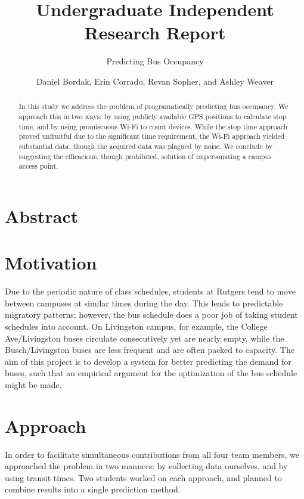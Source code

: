 \documentclass[letterpaper]{scrartcl}
\begin{document}
\title{Undergraduate Independent Research Report}
\subtitle{Predicting Bus Occupancy}
\author{Daniel Bordak, Erin Corrado, Revan Sopher, and Ashley Weaver}

\maketitle

\section*{Abstract}
\begin{abstract}
In this study we address the problem of programatically predicting bus occupancy.
We approach this in two ways: by using publicly available GPS positions to calculate stop time, and by using promiscuous Wi-Fi to count devices.
While the stop time approach proved unfruitful due to the significant time requirement, the Wi-Fi approach yielded substantial data, though the acquired data was plagued by noise.
We conclude by suggesting the efficacious, though prohibited, solution of impersonating a campus access point.
\end{abstract}

\section*{Motivation}

Due to the periodic nature of class schedules, students at Rutgers tend to move between campuses at similar times during the day.
This leads to predictable migratory patterns; however, the bus schedule does a poor job of taking student schedules into account. On Livingston campus, for example, the College Ave/Livingston buses circulate consecutively yet are nearly empty, while the Busch/Livingston buses are less frequent and are often packed to capacity.
The aim of this project is to develop a system for better predicting the demand for buses, such that an empirical argument for the optimization of the bus schedule might be made.

\section*{Approach}

In order to facilitate simultaneous contributions from all four team members, we approached the problem in two manners: by collecting data ourselves, and by using transit times.
Two students worked on each approach, and planned to combine results into a single prediction method.
\end{document}
